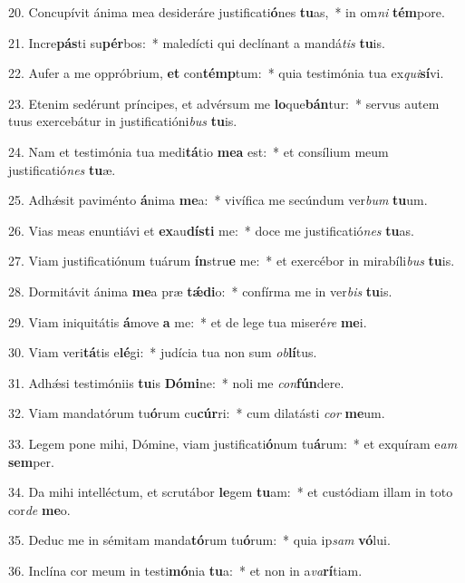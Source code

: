 20. Concupívit ánima mea desideráre justificati\textbf{ó}nes \textbf{tu}as,~*  in om\textit{ni} \textbf{tém}pore.\

21. Incre\textbf{pás}ti su\textbf{pér}bos:~*  maledícti qui declínant a mandá\textit{tis} \textbf{tu}is.\

22. Aufer a me oppróbrium, \textbf{et} con\textbf{témp}tum:~*  quia testimónia tua ex\textit{qui}\textbf{sí}vi.\

23. Etenim sedérunt príncipes, et advérsum me \textbf{lo}que\textbf{bán}tur:~*  servus autem tuus exercebátur in justificatióni\textit{bus} \textbf{tu}is.\

24. Nam et testimónia tua medi\textbf{tá}tio \textbf{me}\textbf{a} est:~*  et consílium meum justificatió\textit{nes} \textbf{tu}æ.\

25. Adhǽsit paviménto \textbf{á}nima \textbf{me}a:~*  vivífica me secúndum ver\textit{bum} \textbf{tu}um.\

26. Vias meas enuntiávi et \textbf{ex}au\textbf{dís}\textbf{ti} me:~*  doce me justificatió\textit{nes} \textbf{tu}as.\

27. Viam justificatiónum tuárum \textbf{ín}stru\textbf{e} me:~*  et exercébor in mirabíli\textit{bus} \textbf{tu}is.\

28. Dormitávit ánima \textbf{me}a præ \textbf{tǽ}\textbf{di}o:~*  confírma me in ver\textit{bis} \textbf{tu}is.\

29. Viam iniquitátis \textbf{á}move \textbf{a} me:~*  et de lege tua miseré\textit{re} \textbf{me}i.\

30. Viam veri\textbf{tá}tis e\textbf{lé}gi:~*  judícia tua non sum \textit{ob}\textbf{lí}tus.\

31. Adhǽsi testimóniis \textbf{tu}is \textbf{Dó}\textbf{mi}ne:~*  noli me \textit{con}\textbf{fún}dere.\

32. Viam mandatórum tu\textbf{ó}rum cu\textbf{cúr}ri:~*  cum dilatásti \textit{cor} \textbf{me}um.\

33. Legem pone mihi, Dómine, viam justificati\textbf{ó}num tu\textbf{á}rum:~*  et exquíram e\textit{am} \textbf{sem}per.\

34. Da mihi intelléctum, et scrutábor \textbf{le}gem \textbf{tu}am:~*  et custódiam illam in toto cor\textit{de} \textbf{me}o.\

35. Deduc me in sémitam manda\textbf{tó}rum tu\textbf{ó}rum:~*  quia ip\textit{sam} \textbf{vó}lui.\

36. Inclína cor meum in testi\textbf{mó}nia \textbf{tu}a:~*  et non in a\textit{va}\textbf{rí}tiam.\

